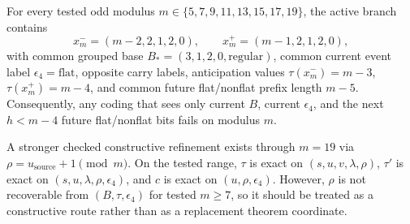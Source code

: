 \begin{proposition}
For every tested odd modulus $m\in\{5,7,9,11,13,15,17,19\}$, the active
branch contains
\[
x^-_m=(m-2,2,1,2,0),
\qquad
x^+_m=(m-1,2,1,2,0),
\]
with common grouped base $B_*=(3,1,2,0,\mathrm{regular})$, common current event
label $\epsilon_4=\mathrm{flat}$, opposite carry labels, anticipation values
$\tau(x^-_m)=m-3$, $\tau(x^+_m)=m-4$, and common future flat/nonflat prefix
length $m-5$.
Consequently, any coding that sees only current $B$, current $\epsilon_4$, and
the next $h<m-4$ future flat/nonflat bits fails on modulus $m$.
\end{proposition}

\begin{remark}
A stronger checked constructive refinement exists through $m=19$ via
$\rho=u_{\mathrm{source}}+1\pmod m$. On the tested range,
$\tau$ is exact on $(s,u,v,\lambda,\rho)$, $\tau'$ is exact on
$(s,u,\lambda,\rho,\epsilon_4)$, and $c$ is exact on $(u,\rho,\epsilon_4)$.
However, $\rho$ is not recoverable from $(B,\tau,\epsilon_4)$ for tested
$m\ge 7$, so it should be treated as a constructive route rather than as a
replacement theorem coordinate.
\end{remark}
